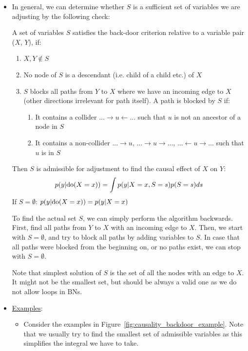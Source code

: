 \begin{itemize}
	\item In general, we can determine whether $S$ is a sufficient set of variables we are adjusting by the following check:
	
	\begin{tcolorbox}[colback=white!80!gray,colframe=gray!75!black,title=Back-door criterion]
		A set of variables $S$ satisfies the back-door criterion relative to a variable pair ($X$, $Y$), if:
		\begin{enumerate}
			\item $X, Y\not\in S$
			\item No node of $S$ is a descendant (i.e. child of a child etc.) of $X$
			\item $S$ blocks all paths from $Y$ to $X$ where we have an incoming edge to $X$ (other directions irrelevant for path itself). A path is blocked by $S$ if:
			\begin{enumerate}
				\item It contains a collider $...\rightarrow u \leftarrow ...$ such that $u$ is not an ancestor of a node in $S$
				\item It contains a non-collider $...\rightarrow u$, $...\rightarrow u \rightarrow ...$, $...\leftarrow u \rightarrow ...$ such that $u$ is in $S$
			\end{enumerate}
		\end{enumerate}
		Then $S$ is admissible for adjustment to find the causal effect of $X$ on $Y$:
		$$p(y|\textnormal{do}(X=x))=\int p(y|X=x,S=s)p(S=s)ds$$
		If $S=\emptyset$: $p(y|\textnormal{do}(X=x))=p(y|X=x)$
	\end{tcolorbox}	

	To find the actual set $S$, we can simply perform the algorithm backwards. First, find all paths from $Y$ to $X$ with an incoming edge to $X$. Then, we start with $S=\emptyset$, and try to block all paths by adding variables to $S$. In case that all paths were blocked from the beginning on, or no paths exist, we can stop with $S=\emptyset$.
	
	Note that simplest solution of $S$ is the set of all the nodes with an edge to $X$. It might not be the smallest set, but should be always a valid one as we do not allow loops in BNs.
	
	\item \underline{Examples}: 
	\begin{itemize}
		\item Consider the examples in Figure~\ref{fig:causality_backdoor_example}. Note that we usually try to find the smallest set of admissible variables as this simplifies the integral we have to take.
		

\end{itemize}
\end{itemize}
